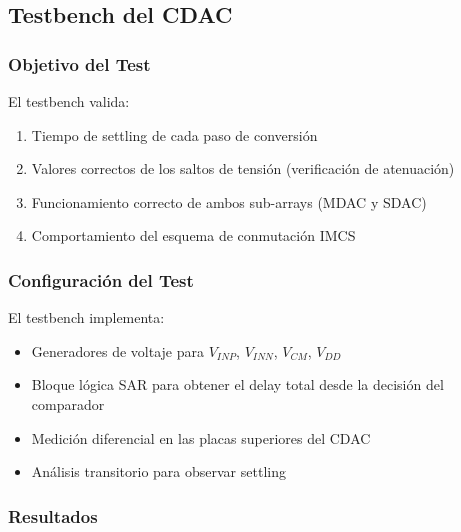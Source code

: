 \documentclass[12pt,a4paper]{report}
\begin{document}
\subsection{Testbench del CDAC}

\subsubsection{Objetivo del Test}

El testbench valida:
\begin{enumerate}
    \item Tiempo de settling de cada paso de conversión
    \item Valores correctos de los saltos de tensión (verificación de atenuación)
    \item Funcionamiento correcto de ambos sub-arrays (MDAC y SDAC)
    \item Comportamiento del esquema de conmutación IMCS
\end{enumerate}

\subsubsection{Configuración del Test}


El testbench implementa:
\begin{itemize}
    \item Generadores de voltaje para $V_{INP}$, $V_{INN}$, $V_{CM}$, $V_{DD}$
    \item Bloque lógica SAR para obtener el delay total desde la decisión del comparador
    \item Medición diferencial en las placas superiores del CDAC
    \item Análisis transitorio para observar settling
\end{itemize}

\subsubsection{Resultados}
\end{document}
